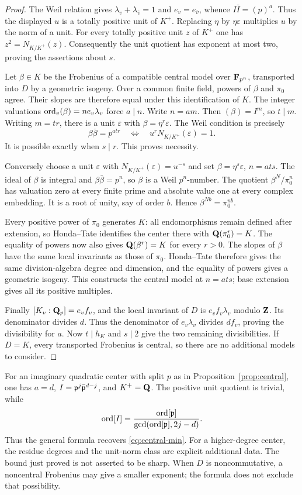 \begin{proof}
The Weil relation gives $\lambda_v+\lambda_{\bar v}=1$ and
$e_v=e_{\bar v}$, whence $I\bar I=(p)^a$. Thus the displayed
$u$ is a totally positive unit of $K^+$. Replacing $\eta$ by
$\eta\varepsilon$ multiplies $u$ by the norm of a unit. For
every totally positive unit $z$ of $K^+$ one has
$z^2=N_{K/K^+}(z)$. Consequently the unit quotient has exponent
at most two, proving the assertions about $s$.

Let $\beta\in K$ be the Frobenius of a compatible central model
over $\mathbf F_{p^n}$, transported into $D$ by a geometric isogeny.
Over a common finite field, powers of $\beta$ and $\pi_0$ agree.
Their slopes are therefore equal under this identification of
$K$. The integer valuations $\operatorname{ord}_v(\beta)=ne_v\lambda_v$
force $a\mid n$. Write $n=am$. Then $(\beta)=I^m$, so
$t\mid m$. Writing $m=tr$, there is a unit $\varepsilon$ with
$\beta=\eta^r\varepsilon$. The Weil condition is precisely
\[
       \beta\bar\beta=p^{atr}
       \quad\Longleftrightarrow\quad
       u^rN_{K/K^+}(\varepsilon)=1.
\]
It is possible exactly when $s\mid r$. This proves necessity.

Conversely choose a unit $\varepsilon$ with
$N_{K/K^+}(\varepsilon)=u^{-s}$ and set
$\beta=\eta^s\varepsilon$, $n=ats$. The ideal of $\beta$ is
integral and $\beta\bar\beta=p^n$, so $\beta$ is a Weil
$p^n$-number. The quotient $\beta^N/\pi_0^n$ has valuation zero
at every finite prime and absolute value one at every complex
embedding. It is a root of unity, say of order $b$. Hence
$\beta^{Nb}=\pi_0^{nb}$.

Every positive power of $\pi_0$ generates $K$: all endomorphisms
remain defined after extension, so Honda--Tate identifies the
center there with $\mathbf Q(\pi_0^r)=K$. The equality of powers now
also gives $\mathbf Q(\beta^r)=K$ for every $r>0$. The slopes of
$\beta$ have the same local invariants as those of $\pi_0$.
Honda--Tate therefore gives the same division-algebra degree and
dimension, and the equality of powers gives a geometric isogeny.
This constructs the central model at $n=ats$; base extension gives
all its positive multiples.

Finally $[K_v:\mathbf Q_p]=e_vf_v$, and the local invariant of $D$ is
$e_vf_v\lambda_v$ modulo $\mathbf Z$. Its denominator divides $d$.
Thus the denominator of $e_v\lambda_v$ divides $df_v$, proving
the divisibility for $a$. Now $t\mid h_K$ and $s\mid2$ give
the two remaining divisibilities. If $D=K$, every transported
Frobenius is central, so there are no additional models to consider.
\end{proof}

For an imaginary quadratic center with split $p$ as in
Proposition~\ref{prop:central}, one has $a=d$,
$I=\mathfrak p^j\bar{\mathfrak p}^{d-j}$, and $K^+=\mathbf Q$. The positive unit
quotient is trivial, while
\[
 \operatorname{ord}[I]=\frac{\operatorname{ord}[\mathfrak p]}{\gcd(\operatorname{ord}[\mathfrak p],2j-d)}.
\]
Thus the general formula recovers \eqref{eq:central-min}.
For a higher-degree center, the residue degrees and the unit-norm
class are explicit additional data. The bound just proved is not
asserted to be sharp. When $D$ is noncommutative, a noncentral
Frobenius may give a smaller exponent; the formula does not exclude
that possibility.
